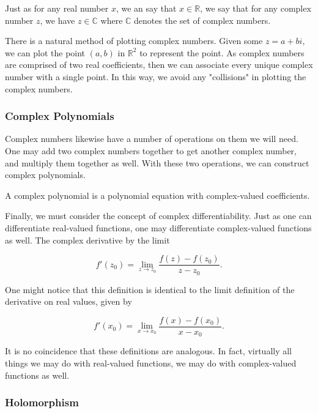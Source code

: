 \documentclass[12pt]{article}
\def\RR{{\mathbb R}}
\def\CC{{\mathbb C}}
\begin{document}
Just as for any real number $x$, we an say that $x\in\RR$, we say that for any complex number $z$, we have $z\in\CC$ where $\CC$ denotes the set of complex numbers. 

There is a natural method of plotting complex numbers. Given some $z=a+bi$, we can plot the point $(a,b)$ in $\RR^2$ to represent the point. As complex numbers are comprised of two real coefficients, then we can associate every unique complex number with a single point. In this way, we avoid any "collisions" in plotting the complex numbers. 

\subsubsection{Complex Polynomials}

Complex numbers likewise have a number of operations on them we will need. One may add two complex numbers together to get another complex number, and multiply them together as well. With these two operations, we can construct complex polynomials. 

\begin{defin} A complex polynomial is a polynomial equation with complex-valued coefficients.
\end{defin}

Finally, we must consider the concept of complex differentiability. Just as one can differentiate real-valued functions, one may differentiate complex-valued functions as well. The complex derivative by the limit

\begin{equation}
f'(z_0) = \lim_{z\to z_0} \frac{f(z)-f(z_0)}{z-z_0}.
\end{equation} 
 
One might notice that this definition is identical to the limit definition of the derivative on real values, given by 

\begin{equation}
f'(x_0) = \lim_{x\to x_0}\frac{f(x)-f(x_0)}{x-x_0}.
\end{equation}
 
It is no coincidence that these definitions are analogous. In fact, virtually all things we may do with real-valued functions, we may do with complex-valued functions as well.

\subsubsection{Holomorphism}
\end{document}
